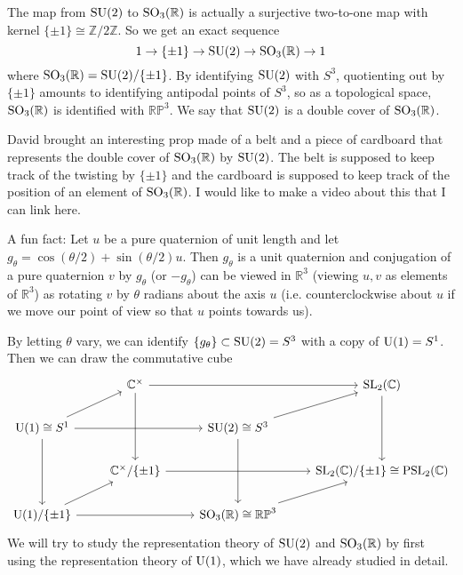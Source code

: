 \documentclass[../../rtnotes.tex]{subfiles}
\begin{document}
The map from $\operatorname{SU}(2)$ to $\operatorname{SO}_3(\mathbb R)$ is actually a surjective two-to-one map with kernel $\{\pm 1\}\cong\mathbb Z/2\mathbb Z$. So we get an exact sequence 
\[1\to \{\pm 1\}\to \operatorname{SU}(2)\to\operatorname{SO}_3(\mathbb R)\to 1\]
where $\operatorname{SO}_3(\mathbb R) = \operatorname{SU}(2)/\{\pm 1\}$. By identifying $\operatorname{SU}(2)$ with $S^3$, quotienting out by $\{\pm 1\}$ amounts to identifying antipodal points of $S^3$, so as a topological space, $\operatorname{SO}_3(\mathbb R)$ is identified with $\mathbb{RP}^3$. We say that $\operatorname{SU}(2)$ is a double cover of $\operatorname{SO}_3(\mathbb R)$.

David brought an interesting prop made of a belt and a piece of cardboard that represents the double cover of $\operatorname{SO}_3(\mathbb R)$ by $\operatorname{SU}(2)$. The belt is supposed to keep track of the twisting by $\{\pm 1\}$ and the cardboard is supposed to keep track of the position of an element of $\operatorname{SO}_3(\mathbb R)$. I would like to make a video about this that I can link here.

A fun fact: Let $u$ be a pure quaternion of unit length and let $g_\theta = \cos(\theta/2) + \sin(\theta/2)u$. Then $g_\theta$ is a unit quaternion and conjugation of a pure quaternion $v$ by $g_\theta$ (or $-g_\theta$) can be viewed in $\mathbb R^3$ (viewing $u,v$ as elements of $\mathbb R^3$) as rotating $v$ by $\theta$ radians about the axis $u$ (i.e. counterclockwise about $u$ if we move our point of view so that $u$ points towards us).

By letting $\theta$ vary, we can identify $\{g_\theta\}\subset \operatorname{SU}(2) = S^3$ with a copy of $\operatorname{U}(1)=S^1$. Then we can draw the commutative cube
\[\begin{tikzcd}[ampersand replacement=\&]
	\& {\mathbb C^\times} \&\& {\SL_2(\mathbb C)} \\
	{\U(1)\cong S^1} \&\& {\SU(2)\cong S^3} \\
	\& {\mathbb C^\times/\{\pm 1\}} \&\& {\SL_2(\mathbb C)/\{\pm 1\}\cong \PSL_2(\mathbb C)} \\
	{\U(1)/\{\pm 1\}} \&\& {\SO_3(\mathbb R)\cong \mathbb{RP}^3}
	\arrow[from=1-2, to=1-4]
	\arrow[from=1-2, to=3-2]
	\arrow[from=1-4, to=3-4]
	\arrow[from=2-1, to=1-2]
	\arrow[from=2-1, to=2-3]
	\arrow[from=2-1, to=4-1]
	\arrow[from=2-3, to=1-4]
	\arrow[from=2-3, to=4-3]
	\arrow[from=3-2, to=3-4]
	\arrow[from=4-1, to=3-2]
	\arrow[from=4-1, to=4-3]
	\arrow[from=4-3, to=3-4]
\end{tikzcd}\]
We will try to study the representation theory of $\operatorname{SU}(2)$ and $\operatorname{SO}_3(\mathbb R)$ by first using the representation theory of $\operatorname{U}(1)$, which we have already studied in detail.
\end{document}
